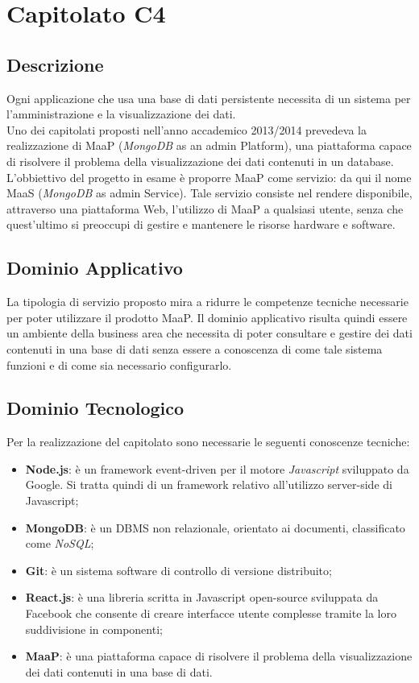 \newpage
\section{Capitolato C4}
\subsection{Descrizione}
Ogni applicazione che usa una base di dati persistente necessita di un sistema per l'amministrazione e la visualizzazione dei dati.\\ Uno dei capitolati proposti nell'anno accademico 2013/2014 prevedeva la realizzazione di MaaP (\textit{MongoDB} as an admin Platform), una piattaforma capace di risolvere il problema della visualizzazione dei dati contenuti in un database.\\ 
L'obbiettivo del progetto in esame è proporre MaaP come servizio: da qui il nome MaaS (\textit{MongoDB} as admin Service). Tale servizio consiste nel rendere disponibile, attraverso una piattaforma Web, l'utilizzo di MaaP a qualsiasi utente, senza che quest'ultimo si preoccupi di gestire e mantenere le risorse hardware e software. 

\subsection{Dominio Applicativo}
La tipologia di servizio proposto mira a ridurre le competenze tecniche necessarie per poter utilizzare il prodotto MaaP. Il dominio applicativo risulta quindi essere un ambiente della business area che necessita di poter consultare e gestire dei dati contenuti in una base di dati senza essere a conoscenza di come tale sistema funzioni e di come sia necessario configurarlo. 

\subsection{Dominio Tecnologico}
Per la realizzazione del capitolato sono necessarie le seguenti conoscenze tecniche:
\begin{itemize}
	\item \textbf{Node.js}: è un framework event-driven per il motore \textit{Javascript} sviluppato da Google. Si tratta quindi di un framework relativo all'utilizzo server-side di Javascript; 
	\item \textbf{MongoDB}: è un DBMS non relazionale, orientato ai documenti, classificato come \textit{NoSQL};
	\item \textbf{Git}: è un sistema software di controllo di versione distribuito; 
	\item \textbf{React.js}: è una libreria scritta in Javascript open-source sviluppata da Facebook che consente di creare interfacce utente complesse tramite la loro suddivisione in componenti; 
	\item \textbf{MaaP}: è una piattaforma capace di risolvere il problema della visualizzazione dei dati contenuti in una base di dati.	
\end{itemize}

